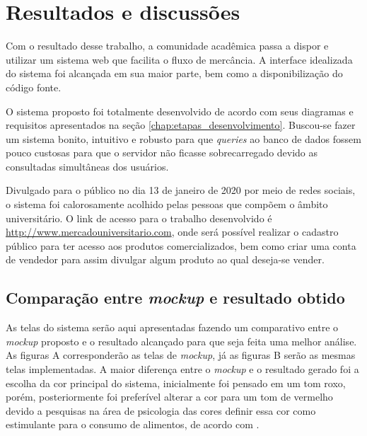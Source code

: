 \chapter{Resultados e discussões}
\label{chap:resultados}

Com o resultado desse trabalho, a comunidade acadêmica passa a dispor e utilizar um sistema web que facilita o fluxo de mercância. A interface idealizada do sistema foi alcançada em sua maior parte, bem como a disponibilização do código fonte.

O sistema proposto foi totalmente desenvolvido de acordo com seus diagramas e requisitos apresentados na seção \ref{chap:etapas_desenvolvimento}. Buscou-se fazer um sistema bonito, intuitivo e robusto para que \textit{queries} ao banco de dados fossem pouco custosas para que o servidor não ficasse sobrecarregado devido as consultadas simultâneas dos usuários.

Divulgado para o público no dia 13 de janeiro de 2020 por meio de redes sociais, o sistema foi calorosamente acolhido pelas pessoas que compõem o âmbito universitário. O link de acesso para o trabalho desenvolvido é \url{http://www.mercadouniversitario.com}, onde será possível realizar o cadastro público para ter acesso aos produtos comercializados, bem como criar uma conta de vendedor para assim divulgar algum produto ao qual deseja-se vender.

\section{Comparação entre \textit{mockup} e resultado obtido}

As telas do sistema serão aqui apresentadas fazendo um comparativo entre o \textit{mockup} proposto e o resultado alcançado para que seja feita uma melhor análise. As figuras A corresponderão as telas de \textit{mockup}, já as figuras B serão as mesmas telas implementadas. A maior diferença entre o \textit{mockup} e o resultado gerado foi a escolha da cor principal do sistema, inicialmente foi pensado em um tom roxo, porém, posteriormente foi preferível alterar a cor para um tom de vermelho devido a pesquisas na área de psicologia das cores definir essa cor como estimulante para o consumo de alimentos, de acordo com \cite{verginaciinfluencia}.

